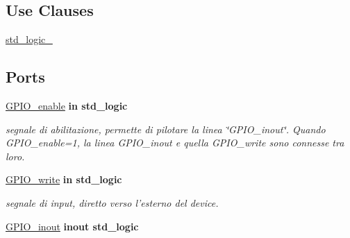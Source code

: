 \subsection*{Use Clauses}
 \begin{DoxyCompactItemize}
\item 
\hypertarget{class_g_p_i_osingle_gacd03516902501cd1c7296a98e22c6fcb}{\hyperlink{group__my_g_p_i_o_gacd03516902501cd1c7296a98e22c6fcb}{std\+\_\+logic\+\_}   }\label{class_g_p_i_osingle_gacd03516902501cd1c7296a98e22c6fcb}

\end{DoxyCompactItemize}
\subsection*{Ports}
 \begin{DoxyCompactItemize}
\item 
\hypertarget{class_g_p_i_osingle_ga0ae7f62d9fa2c19d7ad2ad7574b58871}{\hyperlink{group__my_g_p_i_o_ga0ae7f62d9fa2c19d7ad2ad7574b58871}{G\+P\+I\+O\+\_\+enable}  {\bfseries {\bfseries \textcolor{vhdlchar}{in}\textcolor{vhdlchar}{ }}} {\bfseries \textcolor{vhdlchar}{std\+\_\+logic}\textcolor{vhdlchar}{ }} }\label{class_g_p_i_osingle_ga0ae7f62d9fa2c19d7ad2ad7574b58871}

\begin{DoxyCompactList}\small\item\em segnale di abilitazione, permette di pilotare la linea \char`\"{}\+G\+P\+I\+O\+\_\+inout\char`\"{}. Quando G\+P\+I\+O\+\_\+enable=1, la linea G\+P\+I\+O\+\_\+inout e quella G\+P\+I\+O\+\_\+write sono connesse tra loro. \end{DoxyCompactList}\item 
\hypertarget{class_g_p_i_osingle_ga20547939f304c722cb29df650d7ca7ef}{\hyperlink{group__my_g_p_i_o_ga20547939f304c722cb29df650d7ca7ef}{G\+P\+I\+O\+\_\+write}  {\bfseries {\bfseries \textcolor{vhdlchar}{in}\textcolor{vhdlchar}{ }}} {\bfseries \textcolor{vhdlchar}{std\+\_\+logic}\textcolor{vhdlchar}{ }} }\label{class_g_p_i_osingle_ga20547939f304c722cb29df650d7ca7ef}

\begin{DoxyCompactList}\small\item\em segnale di input, diretto verso l'esterno del device. \end{DoxyCompactList}\item 
\hypertarget{class_g_p_i_osingle_ga979707b3e6ce3920d653c07c91e80f70}{\hyperlink{group__my_g_p_i_o_ga979707b3e6ce3920d653c07c91e80f70}{G\+P\+I\+O\+\_\+inout}  {\bfseries {\bfseries \textcolor{vhdlchar}{inout}\textcolor{vhdlchar}{ }}} {\bfseries \textcolor{vhdlchar}{std\+\_\+logic}\textcolor{vhdlchar}{ }} }\label{class_g_p_i_osingle_ga979707b3e6ce3920d653c07c91e80f70}


\end{DoxyCompactItemize}
